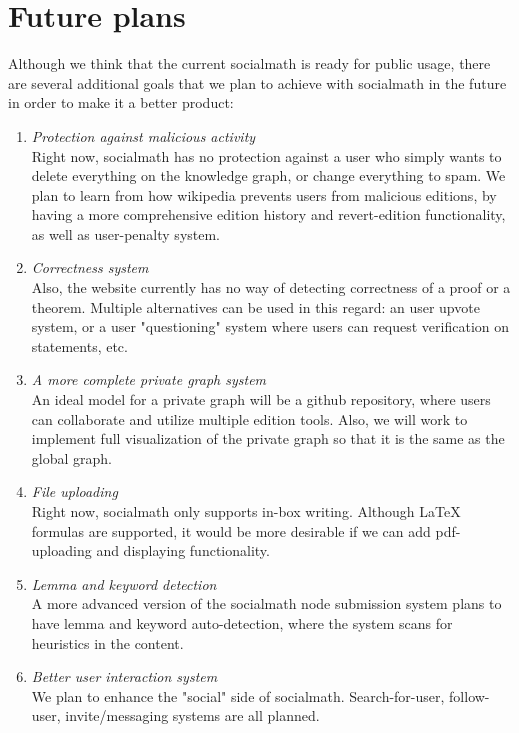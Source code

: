 \documentclass{acm_proc_article-sp}
\begin{document}
\section{Future plans} 
Although we think that the current socialmath is ready for public usage, there are several additional goals that we plan to achieve with socialmath in the future in order to make it a better product:
\begin{enumerate}
\item \emph{Protection against malicious activity} \\
Right now, socialmath has no protection against a user who simply wants to delete everything on the knowledge graph, or change everything to spam. We plan to learn from how wikipedia prevents users from malicious editions, by having a more comprehensive edition history and revert-edition functionality, as well as user-penalty system. 
\item \emph{Correctness system} \\
Also, the website currently has no way of detecting correctness of a proof or a theorem. Multiple alternatives can be used in this regard: an user upvote system, or a user "questioning" system where users can request verification on statements, etc. 
\item \emph{A more complete private graph system} \\
An ideal model for a private graph will be a github repository, where users can collaborate and utilize multiple edition tools. Also, we will work to implement full visualization of the private graph so that it is the same as the global graph. 
\item \emph{File uploading} \\
Right now, socialmath only supports in-box writing. Although LaTeX formulas are supported, it would be more desirable if we can add pdf-uploading and displaying functionality. 
\item \emph{Lemma and keyword detection} \\
A more advanced version of the socialmath node submission system plans to have lemma and keyword auto-detection, where the system scans for heuristics in the content. 
\item \emph{Better user interaction system} \\
We plan to enhance the "social" side of socialmath. Search-for-user, follow-user, invite/messaging systems are all planned. 
\end{enumerate}
\end{document}
